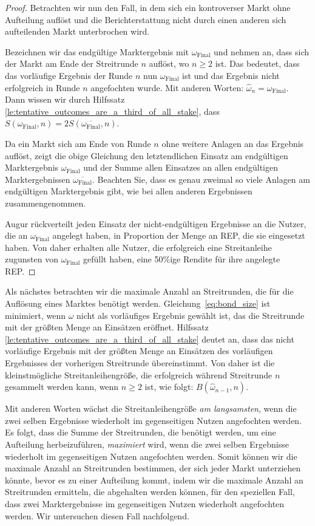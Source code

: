 \documentclass[floatfix,reprint,nofootinbib,amsmath,amssymb,epsfig,pre,floats,letterpaper,groupedaffiliation]{revtex4-1}
\theoremstyle{definition}
\theoremstyle{definition}
\theoremstyle{definition}
\begin{document}
\begin{appendix}
\begin{proof}
Betrachten wir nun den Fall, in dem sich ein kontroverser Markt ohne Aufteilung auflöst und die Berichterstattung nicht durch einen anderen sich aufteilenden Markt unterbrochen wird.

Bezeichnen wir das endgültige Marktergebnis mit $\omega_{\mathrm{Final}}$ und nehmen an, dass sich der Markt am Ende der Streitrunde $n$ auflöst, wo $n \geq 2$ ist. Das bedeutet, dass das vorläufige Ergebnis der Runde $n$ nun $\omega_{\mathrm{Final}}$ ist und das Ergebnis nicht erfolgreich in Runde $n$ angefochten wurde. Mit anderen Worten: $\hat{\omega}_{n} = \omega_{\mathrm{Final}}$. Dann wissen wir durch Hilfssatz \ref{le:tentative_outcomes_are_a_third_of_all_stake}, dass
$ S(\omega_{\mathrm{Final}},n) = 2S(\overline{\omega_{\mathrm{Final}}},n)$.

Da ein Markt sich am Ende von Runde $n$ ohne weitere Anlagen an das Ergebnis auflöst, zeigt die obige Gleichung den letztendlichen Einsatz am endgültigen Marktergebnis $\omega_{\mathrm{Final}}$ und der Summe allen Einsatzes an allen endgültigen Marktergebnissen $\overline{\omega_{\mathrm{Final}}}$. Beachten Sie, dass es genau zweimal so viele Anlagen am endgültigen Marktergebnis gibt, wie bei allen anderen Ergebnissen zusammengenommen.

Augur rückverteilt jeden Einsatz der nicht-endgültigen Ergebnisse an die Nutzer, die an $\omega_{\mathrm{Final}}$ angelegt haben, in Proportion der Menge an REP, die sie eingesetzt haben. Von daher erhalten alle Nutzer, die erfolgreich eine Streitanleihe zugunsten von $\omega_{\mathrm{Final}}$ gefüllt haben, eine 50\%ige Rendite für ihre angelegte REP.
\end{proof}

Als nächstes betrachten wir die maximale Anzahl an Streitrunden, die für die Auflösung eines Marktes benötigt werden. Gleichung~\ref{eq:bond_size} ist minimiert, wenn $\omega$ nicht als vorläufiges Ergebnis gewählt ist, das die Streitrunde mit der größten Menge an Einsätzen eröffnet. Hilfssatz \ref{le:tentative_outcomes_are_a_third_of_all_stake} deutet an, dass das nicht vorläufige Ergebnis mit der größten Menge an Einsätzen des vorläufigen Ergebnisses der vorherigen Streitrunde übereinstimmt. Von daher ist die kleinstmögliche Streitanleihengröße, die erfolgreich während Streitrunde $n$ gesammelt werden kann, wenn $n \geq 2$ ist, wie folgt: $B(\hat{\omega}_{n-1},n)$.

Mit anderen Worten wächst die Streitanleihengröße \emph{am langsamsten}, wenn die zwei selben Ergebnisse wiederholt im gegenseitigen Nutzen angefochten werden. Es folgt, dass die Summe der Streitrunden, die benötigt werden, um eine Aufteilung herbeizuführen, \emph{maximiert} wird, wenn die zwei selben Ergebnisse wiederholt im gegenseitigen Nutzen angefochten werden. Somit können wir die maximale Anzahl an Streitrunden bestimmen, der sich jeder Markt unterziehen könnte, bevor es zu einer Aufteilung kommt, indem wir die maximale Anzahl an Streitrunden ermitteln, die abgehalten werden können, für den speziellen Fall, dass zwei Marktergebnisse im gegenseitigen Nutzen wiederholt angefochten werden. Wir untersuchen diesen Fall nachfolgend.


\end{appendix}
\end{document}
